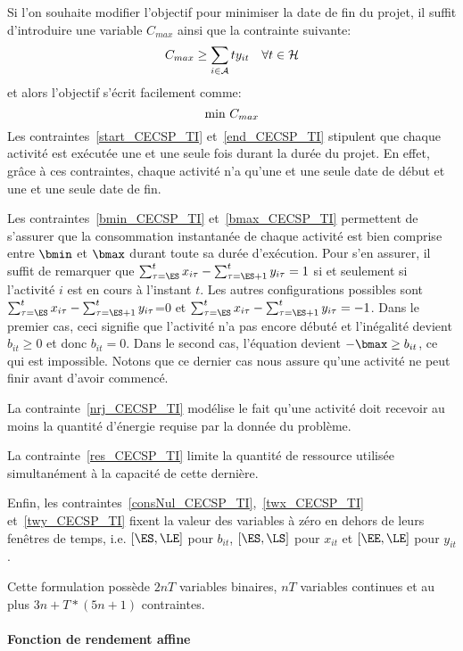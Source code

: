 Si l'on souhaite modifier l'objectif pour minimiser la date de fin
du projet, il suffit d'introduire une variable $C_{max}$ ainsi que
la contrainte suivante: 
\begin{equation} 
C_{max} \ge \sum_{i \in {\cal A}} ty_{it} \quad \forall t \in {\cal H} \notag
\end{equation} 
et alors l'objectif s'écrit facilement comme: 
\begin{equation}
\text{min } C_{max} \notag
\end{equation} 
Les contraintes~\eqref{start_CECSP_TI} et~\eqref{end_CECSP_TI}
stipulent que chaque activité est exécutée une et une seule fois
durant la durée du projet. En effet, grâce à ces contraintes, chaque
activité n'a qu'une et une seule date de début et une et une seule
date de fin.

Les contraintes~\eqref{bmin_CECSP_TI} et~\eqref{bmax_CECSP_TI}
permettent de s'assurer que la consommation instantanée de chaque
activité est bien comprise entre $\bmin$ et $\bmax$ durant toute sa
durée d'exécution. Pour s'en assurer, il suffit de remarquer que
$\sum_{\tau=\ES}^{t} x_{i\tau} -\sum_{\tau=\ES+1}^{t}y_{i\tau}=1$ si
et seulement si l'activité $i$ est en cours à l'instant $t$. Les
autres configurations possibles sont $\sum_{\tau=\ES}^{t} x_{i\tau}
-\sum_{\tau=\ES+1}^{t} y_{i\tau}$=0 et $\sum_{\tau=\ES}^{t} x_{i\tau}
-\sum_{\tau=\ES+1}^{t} y_{i\tau}=-1$. Dans le premier cas, ceci
signifie que l'activité n'a pas encore débuté et l'inégalité devient
$b_{it} \ge 0$ et donc $b_{it}=0$. Dans le second cas, l'équation
devient $-\bmax \ge b_{it}$, ce qui est impossible. Notons que ce
dernier cas nous assure qu'une activité ne peut finir avant d'avoir
commencé.

La contrainte~\eqref{nrj_CECSP_TI} modélise le fait qu'une activité
doit recevoir au moins la quantité d'énergie requise par la donnée du
problème.

La contrainte~\eqref{res_CECSP_TI} limite la quantité de ressource
utilisée simultanément à la capacité de cette dernière.

Enfin, les contraintes~\eqref{consNul_CECSP_TI},~\eqref{twx_CECSP_TI}
et~\eqref{twy_CECSP_TI} fixent la valeur des variables à zéro en
dehors de leurs fenêtres de temps, i.e. $[\ES,\LE]$ pour $b_{it}$,
$[\ES,\LS]$ pour $x_{it}$ et $[\EE,\LE]$ pour $y_{it}$.

Cette formulation possède $2nT$ variables binaires, $nT$ variables
continues et au plus $3n+T*(5n+1)$ contraintes.

\paragraph{Fonction de rendement affine}

